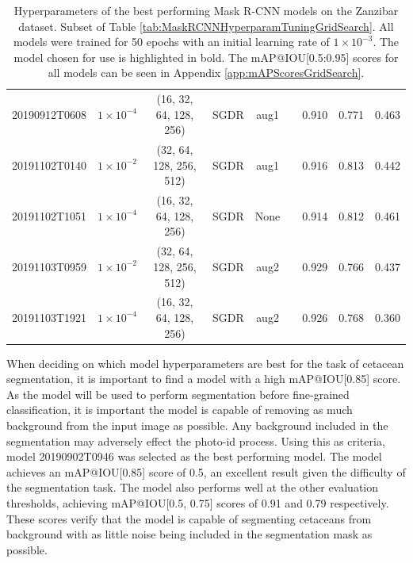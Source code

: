 \begin{table}[!ht]
\begin{adjustbox}{width=\columnwidth, center}
\begin{tabular}{ccccccccc}
			20190912T0608 &       $1\times10^{-4}$ &   (16, 32, 64, 128, 256) &      SGDR &                  aug1 &                  \cmark & 0.910 & 0.771 & 0.463 \\
			20191102T0140 &         $1\times10^{-2}$ &  (32, 64, 128, 256, 512) &      SGDR &                  aug1 &                  \cmark & 0.916 & 0.813 & 0.442\\
			20191102T1051 &       $1\times10^{-4}$ &   (16, 32, 64, 128, 256) &      SGDR &                  None &                  \cmark & 0.914 & 0.812 & 0.461\\
			20191103T0959 &         $1\times10^{-2}$ &  (32, 64, 128, 256, 512) &      SGDR &                  aug2 &                  \cmark & 0.929 & 0.766 & 0.437\\
			20191103T1921 &       $1\times10^{-4}$ &   (16, 32, 64, 128, 256) &      SGDR &                  aug2 &                  \cmark & 0.926 & 0.768 & 0.360\\
			\bottomrule
		\end{tabular}
	\end{adjustbox}
	\caption[Hyperparameters of the best performing Mask R-CNN models on the Zanzibar dataset.]{Hyperparameters of the best performing Mask R-CNN models on the Zanzibar dataset. Subset of Table \ref{tab:MaskRCNNHyperparamTuningGridSearch}. All models were trained for 50 epochs with an initial learning rate of $1\times10^{-3}$. The model chosen for use is highlighted in bold. The mAP@IOU{[}0.5:0.95{]} scores for all models can be seen in Appendix \ref{app:mAPScoresGridSearch}.}
	\label{tab:best-mask-rcnn-models}
\end{table}

When deciding on which model hyperparameters are best for the task of cetacean segmentation, it is important to find a model with a high mAP@IOU[0.85] score. As the model will be used to perform segmentation before fine-grained classification, it is important the model is capable of removing as much background from the input image as possible. Any background included in the segmentation may adversely effect the photo-id process. Using this as criteria, model 20190902T0946 was selected as the best performing model. The model achieves an mAP@IOU[0.85] score of 0.5, an excellent result given the difficulty of the segmentation task. The model also performs well at the other evaluation thresholds, achieving mAP@IOU[0.5, 0.75] scores of 0.91 and 0.79 respectively. These scores verify that the model is capable of segmenting cetaceans from background with as little noise being included in the segmentation mask as possible.

